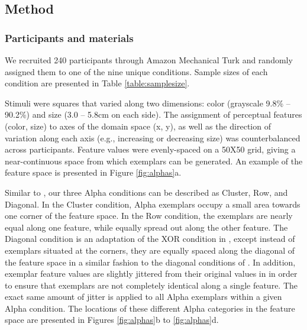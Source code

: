 \documentclass[10pt,letterpaper]{article}
\begin{document}

\subsection{Method}

\subsubsection{Participants and materials}

We recruited 240 participants through Amazon Mechanical Turk and randomly
assigned them to one of the nine unique conditions. Sample sizes of each
condition are presented in Table \ref{table:samplesize}.

Stimuli were squares that varied along two dimensions: color (grayscale
9.8\% -- 90.2\%) and size (3.0 -- 5.8cm on each side). The assignment of perceptual
features (color, size) to axes of the domain space (x, y), as well as the
direction of variation along each axis (e.g., increasing or decreasing size) was
counterbalanced across participants. Feature values were evenly-spaced on a
50X50 grid, giving a near-continuous space from which exemplars can be generated. An example of the feature space is presented in Figure \ref{fig:alphas}a. 

Similar to , our three Alpha conditions can be described as Cluster, Row, and Diagonal. In the Cluster condition, Alpha exemplars occupy a small area towards one corner of the feature space. In the Row condition, the exemplars are nearly equal along one feature, while equally spread out along the other feature. The Diagonal condition is an adaptation of the XOR condition in , except instead of exemplars situated at the corners, they are equally spaced along the diagonal of the feature space in a similar fashion to the diagonal conditions of . In addition, exemplar feature values are slightly jittered from their original values in  in order to ensure that exemplars are not completely identical along a single feature. The exact same amount of jitter is applied to all Alpha exemplars within a given Alpha condition. The locations of these different Alpha categories in the feature space are presented in Figures \ref{fig:alphas}b to \ref{fig:alphas}d.
\end{document}
